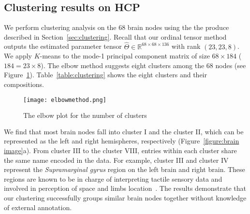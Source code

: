 \documentclass[11pt]{article}
\theoremstyle{plain}
\theoremstyle{definition}
\begin{document}
\subsection{Clustering results on HCP}
We perform clustering analysis on the 68 brain nodes using the the produce described in Section~\ref{sec:clustering}. Recall that our ordinal tensor method outputs the estimated parameter tensor $\hat\Theta\in\mathbb{R}^{68\times 68\times136}$ with rank $(23,23,8)$. 
We apply $K$-means to the mode-1 principal component matrix of size $68\times 184$ ($184=23\times8$). The elbow method suggests eight clusters among the 68 nodes (see Figure~\ref{figure:elbow}). Table~\ref{table:clustering} shows the eight clusters and their compositions. 
\begin{figure}[H]
  \label{figure:elbow}
  \begin{center}
    \texttt{[image: elbowmethod.png]}
  \end{center}
  \caption{The elbow plot for the number of clusters}
\end{figure}


We find that most brain nodes fall into cluster I and the cluster II, which can be represented as the left and right hemispheres, respectively (Figure~\ref{figure:brain image}a). From cluster III to the cluster VIII, entries within each cluster share the same name encoded in the data. For example, cluster III and cluster IV represent the {\it Supramarginal gyrus} region on the left brain and right brain. These regions are known to be in charge of interpreting tactile sensory data and involved in perception of space and limbs location~\cite{carlson2012physiology,reed1994nature}.  
The results demonstrate that our clustering successfully groups similar brain nodes together without knowledge of external annotation.
\end{document}
